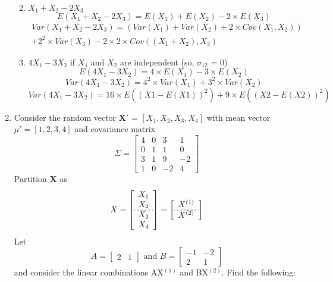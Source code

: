 \documentclass[12pt,a4paper]{paper}
\begin{document}
\begin{enumerate}
\begin{enumerate}
\begin{equation}
\begin{split}
\end{split}
\end{equation}
\item $X_{1} +X_{2}-2X_{3}$
\begin{equation}
E(X_{1} +X_{2}-2X_{3}) = E(X_{1}) + E(X_{2}) - 2 \times E(X_{3})
\end{equation}
\begin{equation}
\begin{split}
Var(X_{1} +X_{2}-2X_{3}) = (Var(X_{1}) + Var(X_{2}) + 2 \times Cov(X_{1},X_{2}))\\ + 2^2 \times Var(X_{3}) - 2 \times 2 \times Cov((X_{1}+X_{2}),X_{3})
\end{split}
\end{equation}
\item $4X_{1} - 3X_{2}$ if $X_{1}$ and $X_{2}$ are independent (so, $\sigma_{12}$ = 0)
\begin{equation}
E(4X_{1} - 3X_{2}) = 4 \times E(X_{1}) - 3 \times E(X_{2})
\end{equation}
\begin{equation}
Var(4X_{1} - 3X_{2}) = 4^2 \times Var(X_{1}) + 3^2 \times Var(X_{2})
\end{equation}
\begin{equation}
Var(4X_{1} - 3X_{2}) = 16 \times E((X1-E(X1))^2) + 9 \times E((X2-E(X2))^2)
\end{equation}
\end{enumerate}
\item Consider the random vector \textbf{X$'$} = $\left[X_{1},X_{2},X_{3},X_{4}\right]$ with mean vector $\mu'= \left[1,2,3,4\right]$ and covariance matrix \[\Sigma=\left[\begin{array}{cccc}
4 & 0 & 3 & 1 \\ 0 & 1 & 1 & 0 \\ 3 & 1 & 9 & -2 \\ 1 & 0 & -2 & 4
\end{array}\right]\] Partition \textbf{X} as \[X=\left[\begin{array}{c}X_{1}\\X_{2}\\\hdashline[2pt/2pt]X_{3}\\X_{4}\end{array}\right] = \left[\begin{array}{c}X^{(1)}\\\hdashline[2pt/2pt]X^{(2)}\end{array}\right]\] Let \[A = \left[\begin{array}{cc}2 & 1\end{array}\right] \text{ and } B = \left[\begin{array}{cc}-1 & -2 \\ 2 & 1\end{array}\right]\] and consider the linear combinations AX$^{(1)}$ and BX$^{(2)}$. Find the following:

\end{enumerate}
\end{document}
